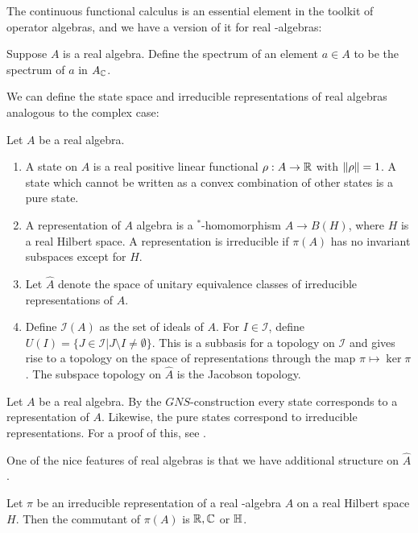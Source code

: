 The continuous functional calculus is an essential element in the toolkit of operator algebras, and we have a version of it for real \Cstar-algebras: 
\begin{definition}
	Suppose $A$ is a real \Cstar algebra. Define the spectrum of an element $a\in A$ to be the spectrum of $a$ in $A_{\mathbb{C}}$.
\end{definition}
We can define the state space and irreducible representations of real \Cstar algebras analogous to the complex case:
\begin{definition}
Let $A$ be a real \Cstar algebra. 
\begin{enumerate}
\item  A state on $A$ is a real positive linear functional $\rho:A\to \mathbb{R}$ with $\left \Vert \rho \right \Vert=1$. A state which cannot be written as a convex combination of other states is a pure state. 
\item 	A representation of $A$ \Cstar algebra is a $^*$-homomorphism $A\to B(H)$, where $H$ is a real Hilbert space. A representation is irreducible if $\pi(A)$ has no invariant subspaces except for $H$. 
\item Let $\hat{A}$ denote the space of unitary equivalence classes of irreducible representations of $A$. 
\item Define $\mathcal{I}(A)$ as the set of ideals of $A$. For $I\in \mathcal{I}$, define $U(I)=\{J\in \mathcal{I}| J\setminus I\neq \emptyset\}$. This is a subbasis for a topology on $\mathcal{I}$ and gives rise to a topology on the space of representations through the map $\pi\mapsto \ker \pi$. The subspace topology on $\hat{A}$ is the Jacobson topology. 
\end{enumerate}
\end{definition}
\begin{remark}
	Let $A$ be a real \Cstar algebra. By the $GNS$-construction every state corresponds to a representation of $A$. Likewise, the pure states correspond to irreducible representations. For a proof of this, see \cite{goodearl}. 
\end{remark}
One of the nice features of real \Cstar algebras is that we have additional structure on $\hat{A}$.
\begin{lemma}
	Let $\pi$ be an irreducible representation of a real \Cstar-algebra $A$ on a real Hilbert space $H$. Then the commutant of $\pi(A)$ is $\mathbb{R},\mathbb{C}$ or $\mathbb{H}$. 
\end{lemma}
